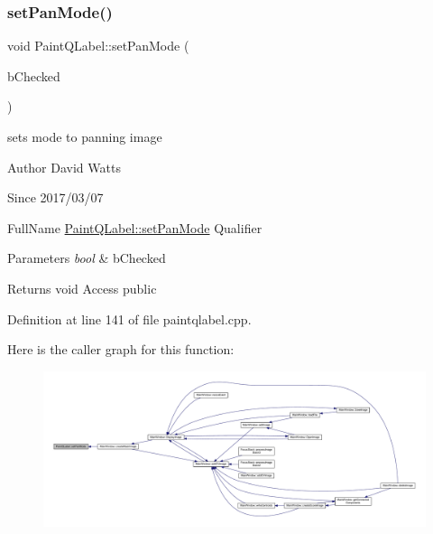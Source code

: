 \subsubsection{\texorpdfstring{set\+Pan\+Mode()}{setPanMode()}}
{\footnotesize\ttfamily void Paint\+Q\+Label\+::set\+Pan\+Mode (\begin{DoxyParamCaption}\item[{bool}]{b\+Checked }\end{DoxyParamCaption})}

sets mode to panning image

\begin{DoxyAuthor}{Author}
David Watts 
\end{DoxyAuthor}
\begin{DoxySince}{Since}
2017/03/07
\end{DoxySince}
Full\+Name \hyperlink{class_paint_q_label_a9f76a4b2851a0906aee6738c91c76969}{Paint\+Q\+Label\+::set\+Pan\+Mode} Qualifier 
\begin{DoxyParams}{Parameters}
{\em bool} & b\+Checked \\
\hline
\end{DoxyParams}
\begin{DoxyReturn}{Returns}
void Access public 
\end{DoxyReturn}


Definition at line 141 of file paintqlabel.\+cpp.

Here is the caller graph for this function\+:
\nopagebreak
\begin{figure}[H]
\begin{center}
\leavevmode
\includegraphics[width=350pt]{class_paint_q_label_a9f76a4b2851a0906aee6738c91c76969_icgraph}
\end{center}
\end{figure}
\mbox{\label{class_paint_q_label_a76f7bb92d5971c324ff0998babd5a70f}} 
